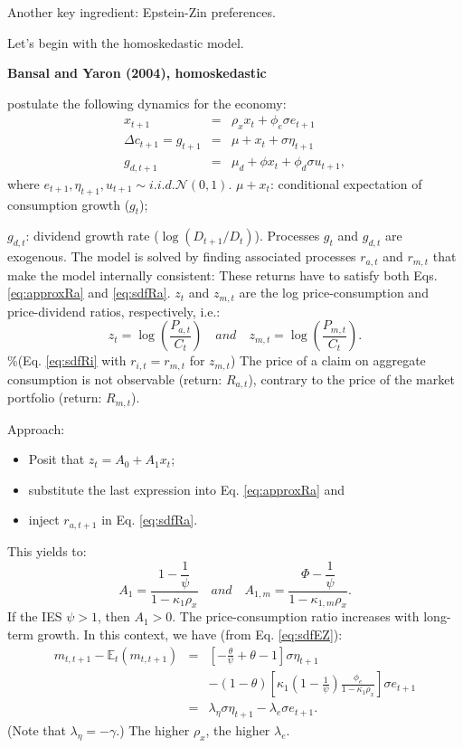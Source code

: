 \documentclass[
  12pt,
]{book}
\providecommand{\tightlist}{%
  \setlength{\itemsep}{0pt}\setlength{\parskip}{0pt}}
\theoremstyle{definition}
\theoremstyle{definition}
\theoremstyle{definition}
\theoremstyle{definition}
\theoremstyle{remark}
\begin{document}
Another key ingredient: Epstein-Zin preferences.

Let's begin with the homoskedastic model.

\textbf{Bansal and Yaron (2004), homoskedastic}

\citet{Bansal_Yaron_2004} postulate the following dynamics for the economy:
\begin{eqnarray*}
x_{t+1} &=& \rho_x x_t + \phi_e \sigma e_{t+1}\\
\Delta c_{t+1} = g_{t+1} &=& \mu + x_t + \sigma \eta_{t+1}\\
g_{d,t+1} &=& \mu_d + \phi x_t + \phi_d \sigma u_{t+1},
\end{eqnarray*}
where \(e_{t+1},\eta_{t+1},u_{t+1} \sim i.i.d. \mathcal{N}(0,1)\).
\(\mu + x_t\): conditional expectation of consumption growth (\(g_t\));

\(g_{d,t}\): dividend growth rate (\(\log(D_{t+1}/D_t)\)).
Processes \(g_t\) and \(g_{d,t}\) are exogenous. The model is solved by finding associated processes \(r_{a,t}\) and \(r_{m,t}\) that make the model internally consistent:
These returns have to satisfy both Eqs. \eqref{eq:approxRa} and \eqref{eq:sdfRa}.
\(z_t\) and \(z_{m,t}\) are the log price-consumption and price-dividend ratios, respectively, i.e.:
\[
z_t = \log\left(\frac{P_{a,t}}{C_t}\right) \quad and \quad z_{m,t} = \log\left(\frac{P_{m,t}}{C_t}\right).
\]
\%(Eq. \eqref{eq:sdfRi} with \(r_{i,t}=r_{m,t}\) for \(z_{m,t}\))
The price of a claim on aggregate consumption is not observable (return: \(R_{a,t}\)), contrary to the price of the market portfolio (return: \(R_{m,t}\)).

Approach:

\begin{itemize}
\tightlist
\item
  Posit that \(z_t = A_0 + A_1 x_t\);
\item
  substitute the last expression into Eq. \eqref{eq:approxRa} and
\item
  inject \(r_{a,t+1}\) in Eq. \eqref{eq:sdfRa}.
\end{itemize}

This yields to:
\begin{equation}
A_1 = \frac{1- \dfrac{1}{\psi}}{1 - \kappa_1 \rho_x} \quad and \quad A_{1,m} = \frac{\Phi- \dfrac{1}{\psi}}{1 - \kappa_{1,m} \rho_x}.\label{eq:solABY1}
\end{equation}
If the IES \(\psi > 1\), then \(A_1 > 0\). The price-consumption ratio increases with long-term growth.
In this context, we have (from Eq. \eqref{eq:sdfEZ}):
\begin{eqnarray}
m_{t,t+1} - \mathbb{E}_t(m_{t,t+1}) &=& \left[  - \frac{\theta}{\psi} + \theta - 1\right] \sigma \eta_{t+1} \nonumber\\
&&- (1 - \theta)\left[ \kappa_1 \left( 1 - \frac{1}{\psi}\right) \frac{\phi_e}{1 - \kappa_1 \rho_x} \right]\sigma e_{t+1}\nonumber\\
&=& \lambda_{\eta} \sigma \eta_{t+1} - \lambda_{e} \sigma e_{t+1}.\label{eq:mBY1}
\end{eqnarray}
(Note that \(\lambda_{\eta} = -\gamma\).)
The higher \(\rho_x\), the higher \(\lambda_{e}\).
\end{document}
